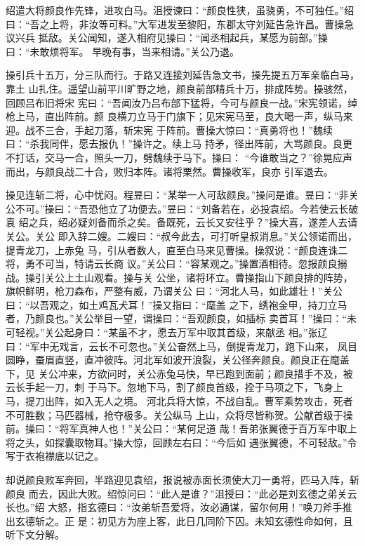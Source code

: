 绍遣大将颜良作先锋，进攻白马。沮授谏曰：“颜良性狭，虽骁勇，不可独任。”绍
曰：“吾之上将，非汝等可料。”大军进发至黎阳，东郡太守刘延告急许昌。曹操急议兴兵
抵敌。关公闻知，遂入相府见操曰：“闻丞相起兵，某愿为前部。”操曰：“未敢烦将军。
早晚有事，当来相请。”关公乃退。

操引兵十五万，分三队而行。于路又连接刘延告急文书，操先提五万军亲临白马，靠土
山扎住。遥望山前平川旷野之地，颜良前部精兵十万，排成阵势。操骇然，回顾吕布旧将宋
宪曰：“吾闻汝乃吕布部下猛将，今可与颜良一战。”宋宪领诺，绰枪上马，直出阵前。颜
良横刀立马于门旗下；见宋宪马至，良大喝一声，纵马来迎。战不三合，手起刀落，斩宋宪
于阵前。曹操大惊曰：“真勇将也！”魏续曰：“杀我同伴，愿去报仇！”操许之。续上马
持矛，径出阵前，大骂颜良。良更不打话，交马一合，照头一刀，劈魏续于马下。操曰：
“今谁敢当之？”徐晃应声而出，与颜良战二十合，败归本阵。诸将栗然。曹操收军，良亦
引军退去。

操见连斩二将，心中忧闷。程昱曰：“某举一人可敌颜良。”操问是谁。昱曰：“非关
公不可。”操曰：“吾恐他立了功便去。”昱曰：“刘备若在，必投袁绍。今若使云长破袁
绍之兵，绍必疑刘备而杀之矣。备既死，云长又安往乎？”操大喜，遂差人去请关公。关公
即入辞二嫂。二嫂曰：“叔今此去，可打听皇叔消息。”关公领诺而出，提青龙刀，上赤兔
马，引从者数人，直至白马来见曹操。操叙说：“颜良连诛二将，勇不可当，特请云长商
议。”关公曰：“容某观之。”操置酒相待。忽报颜良搦战。操引关公上土山观看。操与关
公坐，诸将环立。曹操指山下颜良排的阵势，旗帜鲜明，枪刀森布，严整有威，乃谓关公
曰：“河北人马，如此雄壮！”关公曰：“以吾观之，如土鸡瓦犬耳！”操又指曰：“麾盖
之下，绣袍金甲，持刀立马者，乃颜良也。”关公举目一望，谓操曰：“吾观颜良，如插标
卖首耳！”操曰：“未可轻视。”关公起身曰：“某虽不才，愿去万军中取其首级，来献丞
相。”张辽曰：“军中无戏言，云长不可忽也。”关公奋然上马，倒提青龙刀，跑下山来，
凤目圆睁，蚕眉直竖，直冲彼阵。河北军如波开浪裂，关公径奔颜良。颜良正在麾盖下，见
关公冲来，方欲问时，关公赤兔马快，早已跑到面前；颜良措手不及，被云长手起一刀，刺
于马下。忽地下马，割了颜良首级，拴于马项之下，飞身上马，提刀出阵，如入无人之境。
河北兵将大惊，不战自乱。曹军乘势攻击，死者不可胜数；马匹器械，抢夺极多。关公纵马
上山，众将尽皆称贺。公献首级于操前。操曰：“将军真神人也！”关公曰：“某何足道
哉！吾弟张翼德于百万军中取上将之头，如探囊取物耳。”操大惊，回顾左右曰：“今后如
遇张翼德，不可轻敌。”令写于衣袍襟底以记之。

却说颜良败军奔回，半路迎见袁绍，报说被赤面长须使大刀一勇将，匹马入阵，斩颜良
而去，因此大败。绍惊问曰：“此人是谁？”沮授曰：“此必是刘玄德之弟关云长也。”绍
大怒，指玄德曰：“汝弟斩吾爱将，汝必通谋，留尔何用！”唤刀斧手推出玄德斩之。正
是：初见方为座上客，此日几同阶下囚。未知玄德性命如何，且听下文分解。